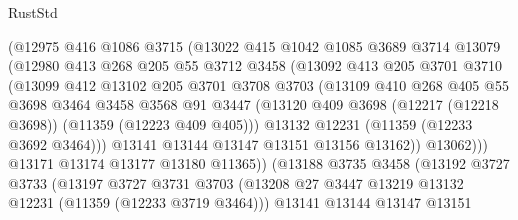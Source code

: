 \begin{lexlean}{RustStd}
\begin{coremodule}
{{{{{{{{{{{{{{{{{{{                    (@12975
                      @416
                      @1086
                      @3715
                      (@13022
                        @415
                        @1042
                        @1085
                        @3689
                        @3714
                        @13079
                        (@12980
                          @413
                          @268
                          @205
                          @55
                          @3712
                          @3458
                          (@13092
                            @413
                            @205
                            @3701
                            @3710
                            (@13099
                              @412
                              @13102
                              @205
                              @3701
                              @3708
                              @3703
                              (@13109
                                @410
                                @268
                                @405
                                @55
                                @3698
                                @3464
                                @3458
                                @3568
                                @91
                                @3447
                                (@13120
                                  @409
                                  @3698
                                  (@12217 (@12218 @3698))
                                  (@11359 (@12223 @409 @405)))
                                @13132
                                @12231
                                (@11359 (@12233 @3692 @3464)))
                              @13141
                              @13144
                              @13147
                              @13151
                              @13156
                              @13162))
                          @13062)))
                    @13171
                    @13174
                    @13177
                    @13180
                    @11365))
                (@13188
                  @3735
                  @3458
                  (@13192
                    @3727
                    @3733
                    (@13197
                      @3727
                      @3731
                      @3703
                      (@13208 @27 @3447 @13219 @13132 @12231 (@11359 (@12233 @3719 @3464)))
                      @13141
                      @13144
                      @13147
                      @13151
}}}}}}}}}}}}}}}}}}}
\end{coremodule}
\end{lexlean}
